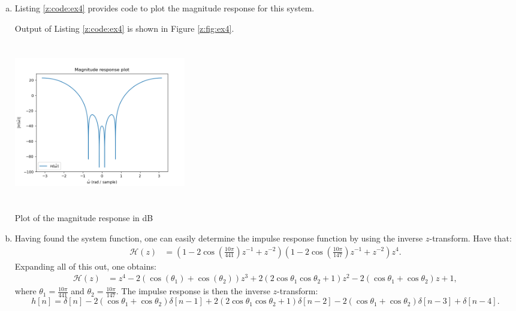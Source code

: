 \begin{enumerate}
\begin{enumerate}[a)]
\item Listing \ref{z:code:ex4} provides code to plot the magnitude response for this system.


Output of Listing \ref{z:code:ex4} is shown in Figure \ref{z:fig:ex4}.

\begin{marginfigure}
\includegraphics[width=7.5cm,height=7.0cm]{ch18/figures/mag2.png}
\caption{Plot of the magnitude response in dB}
\label{z:fig:ex4}
\end{marginfigure}

\item Having found the system function, one can easily determine the impulse response function by using the inverse $z$-transform. Have that:
\begin{align*}
    \mathcal{H}(z)&=(1-2\cos\left(\frac{10\pi}{441}\right)z^{-1}+z^{-2})(1-2\cos\left(\frac{10\pi}{147}\right)z^{-1}+z^{-2})z^{4}. 
\end{align*}
Expanding all of this out, one obtains:
\begin{align*}
    \mathcal{H}(z)&=z^{4} -2(\cos(\theta_1)+\cos(\theta_2))z^{3} + 2(2\cos\theta_1\cos\theta_2 + 1)z^{2} -2(\cos\theta_1+\cos\theta_2) z + 1,
\end{align*}
where $\theta_1=\frac{10\pi}{441}$ and $\theta_2=\frac{10\pi}{147}$. The impulse response is then the inverse $z$-transform:
$$h[n]=\delta[n]-2(\cos\theta_1+\cos\theta_2)\delta[n-1]+2(2\cos\theta_1\cos\theta_2+1)\delta[n-2]-2(\cos\theta_1+\cos\theta_2)\delta[n-3]+\delta[n-4].$$

\end{enumerate}
\end{enumerate}
